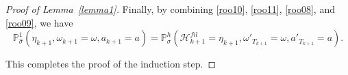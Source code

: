 \documentclass[10pt,a4paper]{amsart}
\renewcommand{\P}{\mathbb{P}}
\begin{document}
\begin{proof}[Proof of Lemma~\ref{lemma1}]
Finally, by combining \eqref{roo10}, \eqref{roo11}, \eqref{roo08}, and \eqref{roo09}, we have
$$\P_{\widehat \sigma}^1(\eta_{k+1}, \omega_{k+1} = \omega, a_{k+1} = a) = 
\P_{\sigma}^h(\mathcal H^{fil}_{k+1} = \eta_{k+1}, \omega'_{T_{k+1}} = \omega, a'_{T_{k+1}} = a).$$

This completes the proof of the induction step.
\end{proof}
\end{document}

